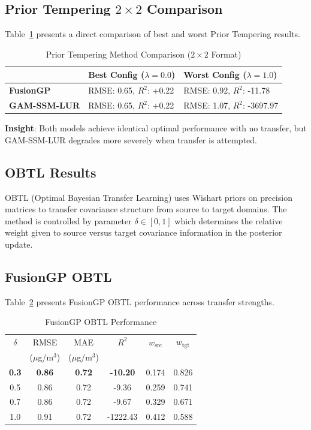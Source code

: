 \subsection{Prior Tempering \(2 \times 2\) Comparison}
\label{subsec:pt_2x2}

Table~\ref{tab:pt_2x2} presents a direct comparison of best and worst Prior Tempering results.

\begin{table}[htbp]
\centering
\caption{Prior Tempering Method Comparison (\(2 \times 2\) Format)}
\label{tab:pt_2x2}
\begin{tabular}{lll}
\toprule
 & \textbf{Best Config (\(\lambda=0.0\))} & \textbf{Worst Config (\(\lambda=1.0\))} \\
\midrule
\textbf{FusionGP} & RMSE: 0.65, \(R^2\): +0.22 & RMSE: 0.92, \(R^2\): -11.78 \\
\textbf{GAM-SSM-LUR} & RMSE: 0.65, \(R^2\): +0.22 & RMSE: 1.07, \(R^2\): -3697.97 \\
\bottomrule
\end{tabular}
\end{table}

\textbf{Insight}: Both models achieve identical optimal performance with no transfer, but GAM-SSM-LUR degrades more severely when transfer is attempted.

\subsection{OBTL Results}
\label{sec:obtl_results}

OBTL (Optimal Bayesian Transfer Learning) \citet{karbalayghareh2018optimal} uses Wishart priors on precision matrices to transfer covariance structure from source to target domains. The method is controlled by parameter \(\delta \in [0, 1]\) which determines the relative weight given to source versus target covariance information in the posterior update.

\subsection{FusionGP OBTL}
\label{subsec:fusiongp_obtl}

Table~\ref{tab:fusiongp_obtl} presents FusionGP OBTL performance across transfer strengths.

\begin{table}[htbp]
\centering
\caption{FusionGP OBTL Performance}
\label{tab:fusiongp_obtl}
\small
\begin{tabular}{cccccc}
\toprule
\(\delta\) & RMSE & MAE & \(R^2\) & \(w_{\text{src}}\) & \(w_{\text{tgt}}\) \\
 & (\(\mu\)g/m\(^3\)) & (\(\mu\)g/m\(^3\)) &  &  &  \\
\midrule
\textbf{0.3} & \textbf{0.86} & \textbf{0.72} & \textbf{-10.20} & 0.174 & 0.826 \\
0.5 & 0.86 & 0.72 & -9.36 & 0.259 & 0.741 \\
0.7 & 0.86 & 0.72 & -9.67 & 0.329 & 0.671 \\
1.0 & 0.91 & 0.72 & -1222.43 & 0.412 & 0.588 \\
\bottomrule
\end{tabular}
\end{table}

